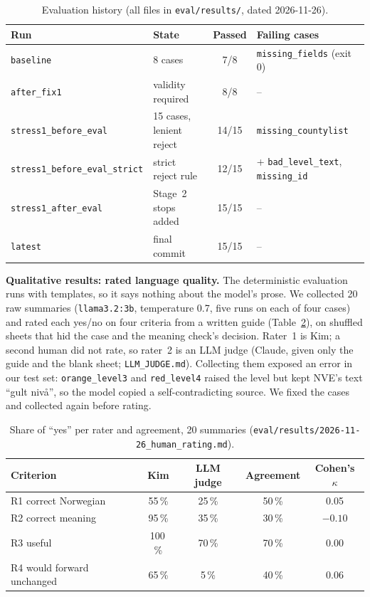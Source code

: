 \documentclass{article}
\newcommand{\code}[1]{\texttt{#1}}
\begin{document}
\begin{table}[htbp]
\centering
\small
\caption{Evaluation history (all files in \code{eval/results/}, dated 2026-11-26).}
\label{tab:evalhist}
\begin{tabular}{@{}l l c l@{}}
\toprule
\textbf{Run} & \textbf{State} & \textbf{Passed} & \textbf{Failing cases} \\
\midrule
\code{baseline} & 8 cases & 7/8 & \code{missing\_fields} (exit 0) \\
\code{after\_fix1} & validity required & 8/8 & -- \\
\code{stress1\_before\_eval} & 15 cases, lenient reject & 14/15 & \code{missing\_countylist} \\
\code{stress1\_before\_eval\_strict} & strict reject rule & 12/15 & + \code{bad\_level\_text}, \code{missing\_id} \\
\code{stress1\_after\_eval} & Stage~2 stops added & 15/15 & -- \\
\code{latest} & final commit & 15/15 & -- \\
\bottomrule
\end{tabular}
\end{table}

\textbf{Qualitative results: rated language quality.} The deterministic evaluation runs with templates, so it says nothing about the model's prose. We collected 20 raw summaries (\code{llama3.2:3b}, temperature 0.7, five runs on each of four cases) and rated each yes/no on four criteria from a written guide (Table~\ref{tab:rating}), on shuffled sheets that hid the case and the meaning check's decision. Rater~1 is Kim; a second human did not rate, so rater~2 is an LLM judge \citep{zheng2023judging} (Claude, given only the guide and the blank sheet; \code{LLM\_JUDGE.md}). Collecting them exposed an error in our test set: \code{orange\_level3} and \code{red\_level4} raised the level but kept NVE's text ``gult nivå'', so the model copied a self-contradicting source. We fixed the cases and collected again before rating.

\begin{table}[htbp]
\centering
\small
\caption{Share of ``yes'' per rater and agreement, 20 summaries (\code{eval/results/2026-11-26\_human\_rating.md}).}
\label{tab:rating}
\begin{tabular}{@{}lcccc@{}}
\toprule
\textbf{Criterion} & \textbf{Kim} & \textbf{LLM judge} & \textbf{Agreement} & \textbf{Cohen's $\kappa$} \\
\midrule
R1 correct Norwegian & 55\,\% & 25\,\% & 50\,\% & 0.05 \\
R2 correct meaning & 95\,\% & 35\,\% & 30\,\% & $-0.10$ \\
R3 useful & 100\,\% & 70\,\% & 70\,\% & 0.00 \\
R4 would forward unchanged & 65\,\% & 5\,\% & 40\,\% & 0.06 \\
\bottomrule
\end{tabular}
\end{table}
\end{document}
